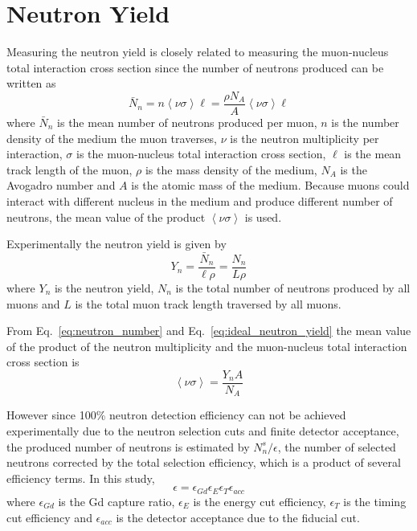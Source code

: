 \documentclass[paper=a4, fontsize=12pt, toc=left]{scrartcl} %
\numberwithin{equation}{section} %
\numberwithin{figure}{section} %
\numberwithin{table}{section} %
\begin{document}
\section{Neutron Yield}
Measuring the neutron yield is closely related to measuring the muon-nucleus total interaction cross section since the number of neutrons produced can be written as
\begin{equation} \label{eq:neutron_number}
	\bar{N}_n=n\left\langle\nu\sigma\right\rangle\ell=\frac{\rho N_A}{A}\left\langle\nu\sigma\right\rangle\ell
\end{equation}
where $\bar{N}_n$ is the mean number of neutrons produced per muon, $n$ is the number density of the medium the muon traverses, $\nu$ is the neutron multiplicity per interaction, $\sigma$ is the muon-nucleus total interaction cross section, $\ell$ is the mean track length of the muon, $\rho$ is the mass density of the medium, $N_A$ is the Avogadro number and $A$ is the atomic mass of the medium. Because muons could interact with different nucleus in the medium and produce different number of neutrons, the mean value of the product $\left\langle\nu\sigma\right\rangle$ is used.

Experimentally the neutron yield is given by
\begin{equation} \label{eq:ideal_neutron_yield}
	Y_n=\frac{\bar{N}_n}{\ell\rho}=\frac{N_n}{L\rho}
\end{equation}
where $Y_n$ is the neutron yield, $N_n$ is the total number of neutrons produced by all muons and $L$ is the total muon track length traversed by all muons.

From Eq.~\ref{eq:neutron_number} and Eq.~\ref{eq:ideal_neutron_yield} the mean value of the product of the neutron multiplicity and the muon-nucleus total interaction cross section is
\begin{equation}
	\left\langle\nu\sigma\right\rangle=\frac{Y_nA}{N_A}
\end{equation}

However since 100\% neutron detection efficiency can not be achieved experimentally due to the neutron selection cuts and finite detector acceptance, the produced number of neutrons is estimated by $N_n^s/\epsilon$, the number of selected neutrons corrected by the total selection efficiency, which is a product of several efficiency terms. In this study,
\begin{equation}
	\epsilon=\epsilon_{Gd}\epsilon_E\epsilon_T\epsilon_{acc}
\end{equation}
where $\epsilon_{Gd}$ is the Gd capture ratio, $\epsilon_E$ is the energy cut efficiency, $\epsilon_T$ is the timing cut efficiency and $\epsilon_{acc}$ is the detector acceptance due to the fiducial cut.
\end{document}

